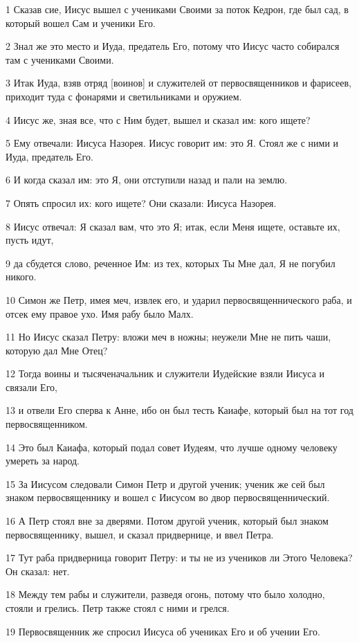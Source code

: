 \par 1 Сказав сие, Иисус вышел с учениками Своими за поток Кедрон, где был сад, в который вошел Сам и ученики Его.
\par 2 Знал же это место и Иуда, предатель Его, потому что Иисус часто собирался там с учениками Своими.
\par 3 Итак Иуда, взяв отряд [воинов] и служителей от первосвященников и фарисеев, приходит туда с фонарями и светильниками и оружием.
\par 4 Иисус же, зная все, что с Ним будет, вышел и сказал им: кого ищете?
\par 5 Ему отвечали: Иисуса Назорея. Иисус говорит им: это Я. Стоял же с ними и Иуда, предатель Его.
\par 6 И когда сказал им: это Я, они отступили назад и пали на землю.
\par 7 Опять спросил их: кого ищете? Они сказали: Иисуса Назорея.
\par 8 Иисус отвечал: Я сказал вам, что это Я; итак, если Меня ищете, оставьте их, пусть идут,
\par 9 да сбудется слово, реченное Им: из тех, которых Ты Мне дал, Я не погубил никого.
\par 10 Симон же Петр, имея меч, извлек его, и ударил первосвященнического раба, и отсек ему правое ухо. Имя рабу было Малх.
\par 11 Но Иисус сказал Петру: вложи меч в ножны; неужели Мне не пить чаши, которую дал Мне Отец?
\par 12 Тогда воины и тысяченачальник и служители Иудейские взяли Иисуса и связали Его,
\par 13 и отвели Его сперва к Анне, ибо он был тесть Каиафе, который был на тот год первосвященником.
\par 14 Это был Каиафа, который подал совет Иудеям, что лучше одному человеку умереть за народ.
\par 15 За Иисусом следовали Симон Петр и другой ученик; ученик же сей был знаком первосвященнику и вошел с Иисусом во двор первосвященнический.
\par 16 А Петр стоял вне за дверями. Потом другой ученик, который был знаком первосвященнику, вышел, и сказал придвернице, и ввел Петра.
\par 17 Тут раба придверница говорит Петру: и ты не из учеников ли Этого Человека? Он сказал: нет.
\par 18 Между тем рабы и служители, разведя огонь, потому что было холодно, стояли и грелись. Петр также стоял с ними и грелся.
\par 19 Первосвященник же спросил Иисуса об учениках Его и об учении Его.
